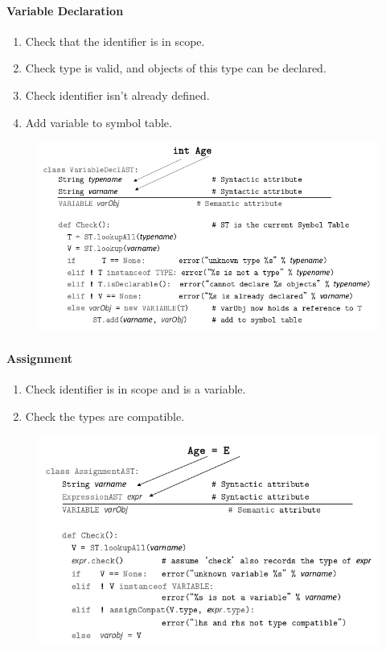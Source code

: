 \documentclass[twocolumn,english]{article}
\begin{document}
\paragraph{Variable Declaration}
\begin{enumerate}
\item Check that the identifier is in scope.
\item Check type is valid, and objects of this type can be declared. 
\item Check identifier isn't already defined. 
\item Add variable to symbol table. 
\end{enumerate}
\begin{figure}[H]
\centering{}\includegraphics[width=0.75\linewidth]{img/var-declaration} 
\end{figure}



\paragraph{Assignment}
\begin{enumerate}
\item Check identifier is in scope and is a variable. 
\item Check the types are compatible. 
\end{enumerate}
\begin{figure}[H]
\centering{}\includegraphics[width=0.7\linewidth]{img/assignment} 
\end{figure}
\end{document}
